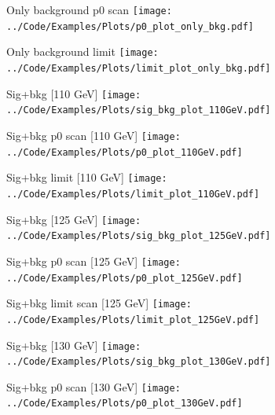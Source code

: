 \documentclass[10pt,UKenglish, leqno, xcolor = dvipsnames]{beamer}
\begin{document}
		\begin{frame}{Only background p0 scan}
			\vfill
			\texttt{[image: ../Code/Examples/Plots/p0\_plot\_only\_bkg.pdf]}
			\vfill
		\end{frame}
	
		\begin{frame}{Only background limit}
			\vfill
			\texttt{[image: ../Code/Examples/Plots/limit\_plot\_only\_bkg.pdf]}
			\vfill
		\end{frame}
	
		\begin{frame}{Sig+bkg [110 GeV]}
			\vfill
			\texttt{[image: ../Code/Examples/Plots/sig\_bkg\_plot\_110GeV.pdf]}
			\vfill
		\end{frame}
	
		\begin{frame}{Sig+bkg p0 scan [110 GeV]}
			\vfill
			\texttt{[image: ../Code/Examples/Plots/p0\_plot\_110GeV.pdf]}
			\vfill
		\end{frame}
		
		\begin{frame}{Sig+bkg limit [110 GeV]}
			\vfill
			\texttt{[image: ../Code/Examples/Plots/limit\_plot\_110GeV.pdf]}
			\vfill
		\end{frame}
	
		\begin{frame}{Sig+bkg [125 GeV]}
			\vfill
			\texttt{[image: ../Code/Examples/Plots/sig\_bkg\_plot\_125GeV.pdf]}
			\vfill
		\end{frame}
		
		\begin{frame}{Sig+bkg p0 scan [125 GeV]}
			\vfill
			\texttt{[image: ../Code/Examples/Plots/p0\_plot\_125GeV.pdf]}
			\vfill
		\end{frame}
		
		\begin{frame}{Sig+bkg limit scan [125 GeV]}
			\vfill
			\texttt{[image: ../Code/Examples/Plots/limit\_plot\_125GeV.pdf]}
			\vfill
		\end{frame}
		
		\begin{frame}{Sig+bkg [130 GeV]}
			\vfill
			\texttt{[image: ../Code/Examples/Plots/sig\_bkg\_plot\_130GeV.pdf]}
			\vfill
		\end{frame}
		
		\begin{frame}{Sig+bkg p0 scan [130 GeV]}
			\vfill
			\texttt{[image: ../Code/Examples/Plots/p0\_plot\_130GeV.pdf]}
			\vfill
		\end{frame}
		
\end{document}
